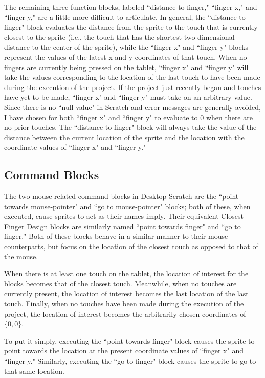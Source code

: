 The remaining three function blocks, labeled ``distance to finger," ``finger x," and ``finger y," are a little more difficult to articulate. In general, the ``distance to finger" block evaluates the distance from the sprite to the touch that is currently closest to the sprite (i.e., the touch that has the shortest two-dimensional distance to the center of the sprite), while the ``finger x" and ``finger y" blocks represent the values of the latest x and y coordinates of that touch. When no fingers are currently being pressed on the tablet, ``finger x" and ``finger y" will take the values corresponding to the location of the last touch to have been made during the execution of the project. If the project just recently began and touches have yet to be made, ``finger x" and ``finger y" must take on an arbitrary value. Since there is no ``null value" in Scratch and error messages are generally avoided, I have chosen for both ``finger x" and ``finger y" to evaluate to $0$ when there are no prior touches. The ``distance to finger" block will always take the value of the distance between the current location of the sprite and the location with the coordinate values of ``finger x" and ``finger y."

\subsection{Command Blocks}
The two mouse-related command blocks in Desktop Scratch are the ``point towards mouse-pointer" and ``go to mouse-pointer" blocks; both of these, when executed, cause sprites to act as their names imply. Their equivalent Closest Finger Design blocks are similarly named ``point towards finger" and ``go to finger." Both of these blocks behave in a similar manner to their mouse counterparts, but focus on the location of the closest touch as opposed to that of the mouse.  

When there is at least one touch on the tablet, the location of interest for the blocks becomes that of the closest touch. Meanwhile, when no touches are currently present, the location of interest becomes the last location of the last touch. Finally, when no touches have been made during the execution of the project, the location of interest becomes the arbitrarily chosen coordinates of $\{0,0\}$.

To put it simply, executing the ``point towards finger" block causes the sprite to point towards the location at the present coordinate values of ``finger x" and ``finger y." Similarly, executing the ``go to finger" block causes the sprite to go to that same location. 

